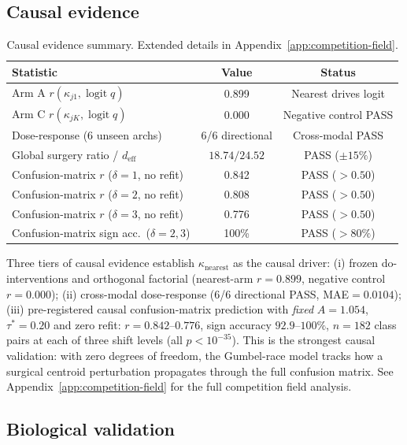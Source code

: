 \documentclass{article}
\DeclareMathOperator{\logit}{logit}
\begin{document}
\subsection{Causal evidence}

\begin{table}[t]
\centering
\caption{Causal evidence summary. Extended details in Appendix~\ref{app:competition-field}.}
\label{tab:causal}
\small
\begin{tabular}{lcc}
\toprule
Statistic & Value & Status \\
\midrule
Arm A $r(\kappa_{j1},\logit q)$ & 0.899 & Nearest drives logit \\
Arm C $r(\kappa_{jK},\logit q)$ & 0.000 & Negative control PASS \\
Dose-response (6 unseen archs) & 6/6 directional & Cross-modal PASS \\
Global surgery ratio / $d_{\mathrm{eff}}$ & $18.74/24.52$ & PASS ($\pm15\%$) \\
\midrule
Confusion-matrix $r$ ($\delta=1$, no refit) & 0.842 & PASS ($>0.50$) \\
Confusion-matrix $r$ ($\delta=2$, no refit) & 0.808 & PASS ($>0.50$) \\
Confusion-matrix $r$ ($\delta=3$, no refit) & 0.776 & PASS ($>0.50$) \\
Confusion-matrix sign acc.\ ($\delta=2,3$) & 100\% & PASS ($>80\%$) \\
\bottomrule
\end{tabular}
\end{table}

Three tiers of causal evidence establish $\kappa_\mathrm{nearest}$ as the causal driver: (i) frozen do-interventions and orthogonal factorial (nearest-arm $r=0.899$, negative control $r=0.000$); (ii) cross-modal dose-response (6/6 directional PASS, MAE$=0.0104$); (iii) pre-registered causal confusion-matrix prediction with \emph{fixed} $A=1.054$, $\tau^*=0.20$ and zero refit: $r=0.842$--$0.776$, sign accuracy $92.9$--$100\%$, $n=182$ class pairs at each of three shift levels (all $p<10^{-35}$). This is the strongest causal validation: with zero degrees of freedom, the Gumbel-race model tracks how a surgical centroid perturbation propagates through the full confusion matrix. See Appendix~\ref{app:competition-field} for the full competition field analysis.

\subsection{Biological validation}
\end{document}
